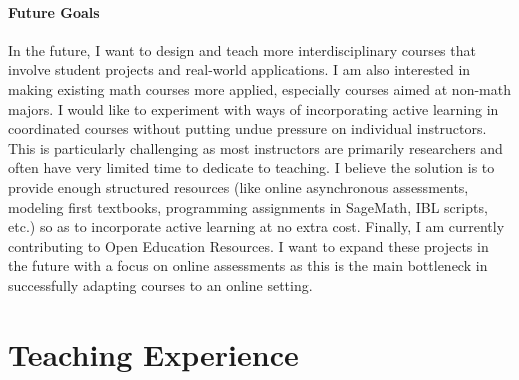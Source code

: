 \documentclass[
]{report}
\begin{document}
\hypertarget{future-goals}{%
\subsubsection*{Future Goals}\label{future-goals}}


In the future, I want to design and teach more interdisciplinary courses that involve student projects and real-world applications.
I am also interested in making existing math courses more applied, especially courses aimed at non-math majors.
I would like to experiment with ways of incorporating active learning in coordinated courses without putting undue pressure on individual instructors.
This is particularly challenging as most instructors are primarily researchers and often have very limited time to dedicate to teaching.
I believe the solution is to provide enough structured resources (like online asynchronous assessments, modeling first textbooks, programming assignments in SageMath, IBL scripts, etc.) so as to incorporate active learning at no extra cost.
Finally, I am currently contributing to Open Education Resources. I want to expand these projects in the future with a focus on online assessments as this is the main bottleneck in successfully adapting courses to an online setting.

\hypertarget{teaching-experience}{%
\chapter{Teaching Experience}\label{teaching-experience}}
\end{document}
